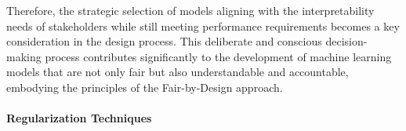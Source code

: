 \begin{itemize}
\begin{itemize}
        Therefore, the strategic selection of models aligning with the interpretability needs of stakeholders while still meeting performance requirements becomes a key consideration in the design process. This deliberate and conscious decision-making process contributes significantly to the development of machine learning models that are not only fair but also understandable and accountable, embodying the principles of the Fair-by-Design approach.

    \end{itemize}

\end{itemize}

\paragraph{Regularization Techniques}

